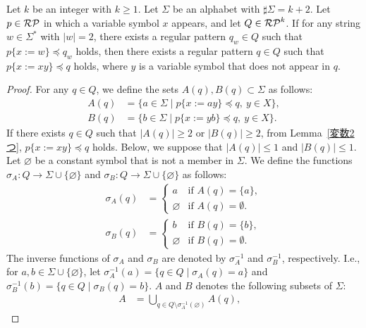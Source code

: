 \begin{lem}\label{追加補題1}
Let $k$ be an integer with $k\geq 1$.
Let $\Sigma$ be an alphabet with $\sharp \Sigma = k + 2$.
Let $p \in \mathcal{RP}$ in which a variable symbol $x$ appears, and let $Q \in \mathcal{RP}^{k}$.
If for any string $w \in \Sigma^{\ast}$ with $|w|=2$, there exists a regular pattern $q_{w} \in Q$ such that $p \{ x:=w \} \preceq q_{w}$ holds, then there exists a regular pattern $q \in Q$ such that $p \{ x:=xy \} \preceq q$ holds, where $y$ is a variable symbol that does not appear in $q$.
\end{lem}

\begin{proof}
For any $q \in Q$, we define the sets $A(q), B(q) \subset \Sigma$ as follows:
\begin{align*}
  A(q) & = \{ a \in \Sigma \mid p \{ x:=ay \} \preceq q,\ y\in X\},\\ 
  B(q) & = \{ b \in \Sigma \mid p \{ x:=yb \} \preceq q,\ y\in X\}.
  \end{align*}
  If there exists $q\in Q$ such that $|A(q)|\geq 2$ or $|B(q)|\geq 2$, from Lemma~\ref{変数2つ}, $p\{x := xy\} \preceq q$ holds.
Below, we suppose that $|A(q)|\leq 1$ and $|B(q)|\leq 1$.
Let $\varnothing$ be a constant symbol that is not a member in $\Sigma$.
We define the functions $\sigma_{A}: Q \rightarrow \Sigma \cup \{\varnothing\}$ and $\sigma_{B}: Q \rightarrow \Sigma \cup \{\varnothing\}$ as follows:
\begin{align*}
  \sigma_{A}(q) & =
  \begin{cases}
    a & \textrm{if } A(q) = \{a\}, \\
    \varnothing & \textrm{if } A(q) = \emptyset.
  \end{cases}\\
  \sigma_{B}(q) & =
  \begin{cases}
    b & \textrm{if } B(q) = \{b\}, \\
    \varnothing & \textrm{if } B(q) = \emptyset.
  \end{cases}
\end{align*}
The inverse functions of $\sigma_{A}$ and $\sigma_{B}$ are denoted by $\sigma_{A}^{-1}$ and $\sigma_{B}^{-1}$, respectively. I.e., for $a,b \in \Sigma \cup \{\varnothing\}$, let $\sigma_{A}^{-1}(a) = \{q \in Q \mid \sigma_{A}(q) = a\}$ and $\sigma_{B}^{-1}(b) = \{q \in Q \mid \sigma_{B}(q) = b\}$. 
%
$A$ and $B$ denotes the following subsets of $\Sigma$:
\begin{align*}
  A & = \bigcup_{q \in Q \setminus \sigma_{A}^{-1}(\varnothing)} A(q) \mbox{,~~~}

\end{align*}
\end{proof}

